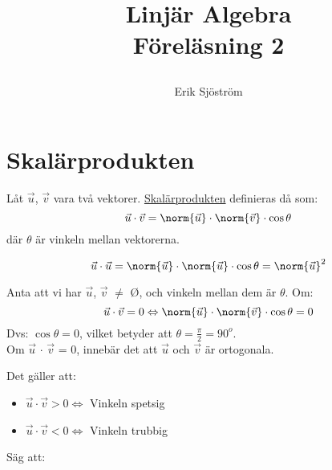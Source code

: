 

\title{
	Linjär Algebra\\
	Föreläsning 2
	\author{Erik Sjöström}
}



\maketitle

\section{Skalärprodukten} %
\label{sec:skal_rprodukten}

Låt $\vec{u}$, $\vec{v}$ vara två vektorer. \underline{Skalärprodukten} definieras då som:
\begin{equation}
    \vec{u} \cdot \vec{v} = \norm{\vec{u}} \cdot \norm{\vec{v}} \cdot \cos{\theta}
\end{equation}
där $\theta$ är vinkeln mellan vektorerna.
\begin{Ex}
    \[
        \vec{u} \cdot \vec{u} = \norm{\vec{u}} \cdot \norm{\vec{u}} \cdot \cos{\theta} = \norm{\vec{u}}^2
    \]
\end{Ex}
\begin{Ex}
    Anta att vi har $\vec{u}$, $\vec{v}$ $\neq$ \O, och vinkeln mellan dem är $\theta$. Om:
    \[
        \vec{u} \cdot \vec{v} = 0 \Leftrightarrow \norm{\vec{u}} \cdot \norm{\vec{v}} \cdot \cos{\theta} = 0
    \]
    Dvs: $\cos{\theta} = 0$, vilket betyder att $\theta = \frac{\pi}{2} = 90^o$. \\
    Om $\vec{u}$ $\cdot$ $\vec{v}$ = 0, innebär det att $\vec{u}$ och $\vec{v}$ är ortogonala.
\end{Ex}
\noindent
Det gäller att:
\begin{itemize}
  \item $\vec{u} \cdot \vec{v} > 0 \Leftrightarrow$ Vinkeln spetsig
  \item $\vec{u} \cdot \vec{v} < 0 \Leftrightarrow$ Vinkeln trubbig
\end{itemize}

Säg att:

